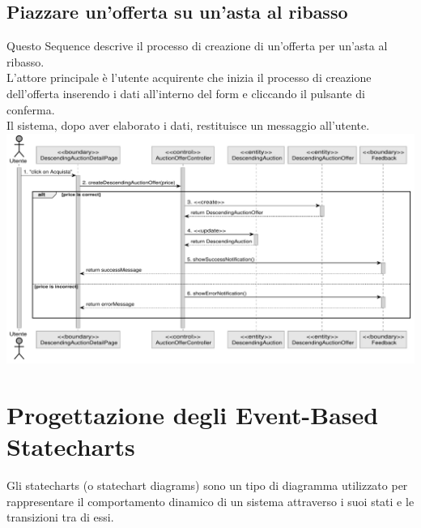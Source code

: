 \subsection{Piazzare un'offerta su un'asta al ribasso}
Questo Sequence descrive il processo di creazione di un'offerta per un'asta al ribasso. 
\\ L'attore principale è l'utente acquirente che inizia il processo di creazione dell'offerta inserendo i dati all'interno del form e cliccando il pulsante di conferma. 
\\ Il sistema, dopo aver elaborato i dati, restituisce un messaggio all'utente. 
\\
\includegraphics[width=\textwidth]{assets/sequence/piazzare_offerta_a_ribasso.pdf}
\newpage

\section{Progettazione degli Event-Based Statecharts}
Gli statecharts (o statechart diagrams) sono un tipo di diagramma utilizzato 
per rappresentare il comportamento dinamico di un sistema attraverso 
i suoi stati e le transizioni tra di essi.
